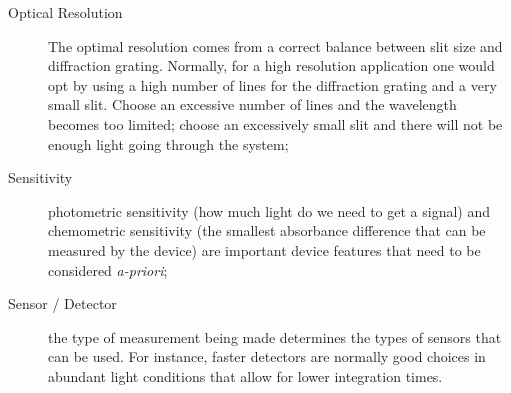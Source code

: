 \begin{description}
    \item[Optical Resolution] The optimal resolution comes from a
        correct balance between slit size and diffraction grating.
        Normally, for a high resolution application one would opt by
        using a high number of lines for the diffraction grating and a
        very small slit. Choose an excessive number of lines and the
        wavelength becomes too limited; choose an excessively small slit
        and there will not be enough light going through the system;
    \item[Sensitivity] photometric sensitivity (how much light do we
        need to get a signal) and chemometric sensitivity (the smallest
        absorbance difference that can be measured by the device) are
        important device features that need to be considered
        \emph{a-priori};
    \item[Sensor / Detector] the type of measurement being made
        determines the types of sensors that can be used. For instance,
        faster detectors are normally good choices in abundant light
        conditions that allow for lower integration times.
\end{description}

